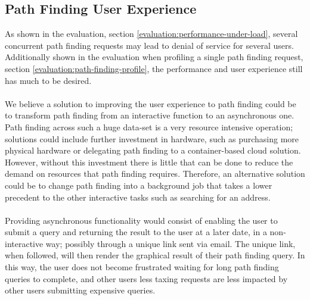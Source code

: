 \subsection{Path Finding User Experience}
As shown in the evaluation, section \ref{evaluation:performance-under-load}, several concurrent path finding requests may lead to denial of service for several users. Additionally shown in the evaluation when profiling a single path finding request, section \ref{evaluation:path-finding-profile}, the performance and user experience still has much to be desired. 
\\\\
We believe a solution to improving the user experience to path finding could be to transform path finding from an interactive function to an asynchronous one. Path finding across such a huge data-set is a very resource intensive operation; solutions could include further investment in hardware, such as purchasing more physical hardware or delegating path finding to a container-based cloud solution. However, without this investment there is little that can be done to reduce the demand on resources that path finding requires. Therefore, an alternative solution could be to change path finding into a background job that takes a lower precedent to the other interactive tasks such as searching for an address. 
\\\\
Providing asynchronous functionality would consist of enabling the user to submit a query and returning the result to the user at a later date, in a non-interactive way; possibly through a unique link sent via email. The unique link, when followed, will then render the graphical result of their path finding query. In this way, the user does not become frustrated waiting for long path finding queries to complete, and other users less taxing requests are less impacted by other users submitting expensive queries. 

